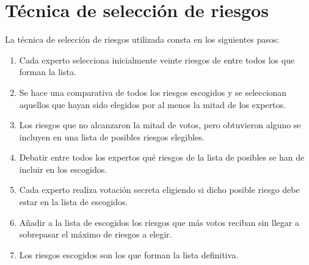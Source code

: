 \documentclass[11pt,a4paper,spanish,twoside]{book}
\begin{document}
\section{Técnica de selección de riesgos}
La técnica de selección de riesgos utilizada consta en los siguientes pasos:
\begin{enumerate}
\item Cada experto selecciona inicialmente veinte riesgos de entre todos los que
  forman la lista.
\item Se hace una comparativa de todos los riesgos escogidos y se seleccionan
  aquellos que hayan sido elegidos por al menos la mitad de los expertos.
\item Los riesgos que no alcanzaron la mitad de votos, pero obtuvieron alguno se
  incluyen en una lista de posibles riesgos elegibles. 
\item Debatir entre todos los expertos qué riesgos de la lista de posibles se 
han de incluir en los escogidos. 
\item Cada experto realiza votación secreta eligiendo si dicho posible riesgo 
debe estar en la lista de escogidos.
\item Añadir a la lista de escogidos los riesgos que más votos reciban sin 
llegar a sobrepasar el máximo de riesgos a elegir.
\item Los riesgos escogidos son los que forman la lista definitiva.
\end{enumerate}
\end{document}
